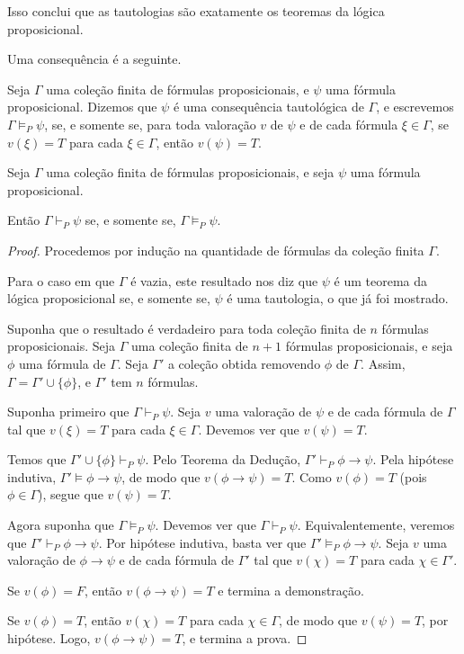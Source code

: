 Isso conclui que as tautologias são exatamente os teoremas da lógica proposicional.

Uma consequência é a seguinte.

\begin{metadefinition}
    Seja $\Gamma$ uma coleção finita de fórmulas proposicionais, e $\psi$ uma fórmula proposicional.
    Dizemos que $\psi$ é uma consequência tautológica de $\Gamma$, e escrevemos $\Gamma\models_P \psi$, se, e somente se, para toda valoração $v$ de $\psi$ e de cada fórmula $\xi\in \Gamma$, se $v(\xi)=T$ para cada $\xi\in \Gamma$, então $v(\psi)=T$.
\end{metadefinition}

\begin{metacorollary}\label{mcor:teoremaSemanticaProposicional}
    Seja $\Gamma$ uma coleção finita de fórmulas proposicionais, e seja $\psi$ uma fórmula proposicional.
    
    Então $\Gamma\vdash_P \psi$ se, e somente se, $\Gamma\models_P \psi$.
\end{metacorollary}

\begin{proof}
    Procedemos por indução na quantidade de fórmulas da coleção finita $\Gamma$.

    Para o caso em que $\Gamma$ é vazia, este resultado nos diz que $\psi$ é um teorema da lógica proposicional se, e somente se, $\psi$ é uma tautologia, o que já foi mostrado.

    Suponha que o resultado é verdadeiro para toda coleção finita de $n$ fórmulas proposicionais.
    Seja $\Gamma$ uma coleção finita de $n+1$ fórmulas proposicionais, e seja $\phi$ uma fórmula de $\Gamma$.
    Seja $\Gamma'$ a coleção obtida removendo $\phi$ de $\Gamma$.
    Assim, $\Gamma=\Gamma'\cup\{\phi\}$, e $\Gamma'$ tem $n$ fórmulas.

    Suponha primeiro que $\Gamma\vdash_P \psi$.
    Seja $v$ uma valoração de $\psi$ e de cada fórmula de $\Gamma$ tal que $v(\xi)=T$ para cada $\xi\in \Gamma$.
    Devemos ver que $v(\psi)=T$.

    Temos que $\Gamma'\cup\{\phi\}\vdash_P \psi$.
    Pelo Teorema da Dedução, $\Gamma'\vdash_P \phi\rightarrow \psi$.
    Pela hipótese indutiva, $\Gamma'\models \phi\rightarrow \psi$, de modo que $v(\phi\rightarrow \psi)=T$.
    Como $v(\phi)=T$ (pois $\phi\in \Gamma$), segue que $v(\psi)=T$.

    Agora suponha que $\Gamma\models_P \psi$.
    Devemos ver que $\Gamma\vdash_P \psi$.
    Equivalentemente, veremos que $\Gamma'\vdash_P \phi\rightarrow \psi$.
    Por hipótese indutiva, basta ver que $\Gamma'\models_P \phi\rightarrow \psi$.
    Seja $v$ uma valoração de $\phi\rightarrow \psi$ e de cada fórmula de $\Gamma'$ tal que $v(\chi)=T$ para cada $\chi\in \Gamma'$.

    Se $v(\phi)=F$, então $v(\phi\rightarrow \psi)=T$ e termina a demonstração.

    Se $v(\phi)=T$, então $v(\chi)=T$ para cada $\chi\in \Gamma$, de modo que $v(\psi)=T$, por hipótese.
    Logo, $v(\phi\rightarrow \psi)=T$, e termina a prova.
\end{proof}


